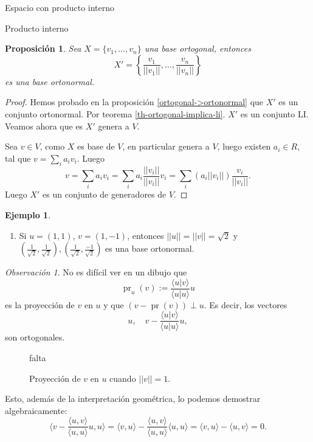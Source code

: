 \documentclass[a4paper,12pt,twoside,spanish,reqno]{amsbook}
\newtheorem{proposicion}[teorema]{Proposici\'on}
\theoremstyle{definition}
\newtheorem{ejemplo}{Ejemplo}[section]
\theoremstyle{remark}
\newtheorem{observacion}{Observaci\'on}[section]
\newcommand{\la}{\langle}
\newcommand{\ra}{\rangle}
\begin{document}
\begin{chapter}{Espacio con producto interno}
\begin{section}{Producto interno}
		\begin{proposicion} Sea $ X = \{v_1,\ldots,v_n\}$ una base ortogonal, entonces 
			\begin{equation*}
				X' = \left\{\frac{v_1}{||v_1||},\ldots,\frac{v_n}{||v_n||} \right\}
			\end{equation*}
			es una base ortonormal.
		\end{proposicion}
		\begin{proof}
			Hemos probado en la proposición \ref{ortogonal->ortonormal} que $X'$ es un conjunto ortonormal.  Por  teorema \ref{th-ortogonal-implica-li}. $X'$ es un conjunto LI.   Veamos ahora que es $X'$ genera a $V$. 
			
			Sea $v \in V$, como $X$  es base de  $V$, en particular genera a $V$, luego existen $a_i \in R$, tal que  $v = \sum_i a_i v_i$. Luego
			$$
			v = \sum_i a_i v_i = \sum_i a_i \frac{||v_i||}{||v_i||} v_i = \sum_i (a_i ||v_i||) \frac{v_i}{||v_i||}.
			$$
			Luego $X'$ es un conjunto de generadores de $V$. 
		\end{proof}
		\begin{ejemplo} 
			\begin{enumerate}
				\item Si $u=(1,1)$, $v=(1,-1)$, entonces $||u||=||v|| = \sqrt{2}$ y $(\frac{1}{\sqrt{2}},\frac{1}{\sqrt{2}}),(\frac{1}{\sqrt{2}},\frac{-1}{\sqrt{2}})$ es una base ortonormal.  
			\end{enumerate}
		\end{ejemplo}
		
		\medskip
		
		\begin{observacion}\label{obs-proyeccion-ort}
			No es difícil ver en un dibujo que 
			\begin{equation*}
				\operatorname{pr}_u(v) := \frac{\la u|v\ra}{\la u|u\ra}u
			\end{equation*}
			 es la proyección de $v$ en $u$ y que   $(v - \operatorname{pr}(v)) \perp u$. Es decir,   los vectores
			\begin{equation*}
					u, \quad   v - \frac{\la u|v\ra}{\la u|u\ra}u,
			\end{equation*}
			son ortogonales.
			\begin{figure}[h]
				falta
				\caption{Proyección de $v$ en $u$ cuando $||v||=1$.}\label{fig-proyeccion-ort}
			\end{figure}
		
		
			Esto,  además de la interpretación geométrica, lo podemos demostrar algebraicamente:
			\begin{equation*}
			\la v - \frac{\la u,v\ra}{\la u,u\ra} u , u \ra =
			\la v , u \ra  -\frac{\la u,v\ra}{\la u,u\ra}\la u , u \ra =  \la v , u \ra -  \la u , v \ra =0.
			\end{equation*}
			

\end{observacion}
\end{section}
\end{chapter}
\end{document}
